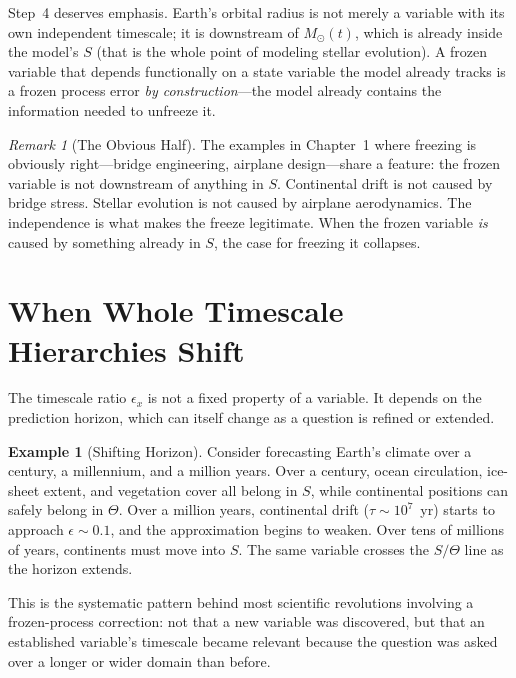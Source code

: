 \documentclass[11pt]{book}
\theoremstyle{plain}
\theoremstyle{definition}
\newtheorem{example}[theorem]{Example}
\theoremstyle{remark}
\newtheorem{remark}[theorem]{Remark}
\begin{document}
Step~4 deserves emphasis. Earth's orbital radius is not merely a variable with its own independent timescale; it is downstream of $M_\odot(t)$, which is already inside the model's $S$ (that is the whole point of modeling stellar evolution). A frozen variable that depends functionally on a state variable the model already tracks is a frozen process error \emph{by construction}---the model already contains the information needed to unfreeze it.

\begin{remark}[The Obvious Half]
The examples in Chapter~1 where freezing is obviously right---bridge engineering, airplane design---share a feature: the frozen variable is not downstream of anything in $S$. Continental drift is not caused by bridge stress. Stellar evolution is not caused by airplane aerodynamics. The independence is what makes the freeze legitimate. When the frozen variable \emph{is} caused by something already in $S$, the case for freezing it collapses.
\end{remark}

\section{When Whole Timescale Hierarchies Shift}

The timescale ratio $\epsilon_x$ is not a fixed property of a variable. It depends on the prediction horizon, which can itself change as a question is refined or extended.

\begin{example}[Shifting Horizon]
Consider forecasting Earth's climate over a century, a millennium, and a million years. Over a century, ocean circulation, ice-sheet extent, and vegetation cover all belong in $S$, while continental positions can safely belong in $\Theta$. Over a million years, continental drift ($\tau \sim 10^7$~yr) starts to approach $\epsilon \sim 0.1$, and the approximation begins to weaken. Over tens of millions of years, continents must move into $S$. The same variable crosses the $S/\Theta$ line as the horizon extends.
\end{example}

This is the systematic pattern behind most scientific revolutions involving a frozen-process correction: not that a new variable was discovered, but that an established variable's timescale became relevant because the question was asked over a longer or wider domain than before.

\end{document}
